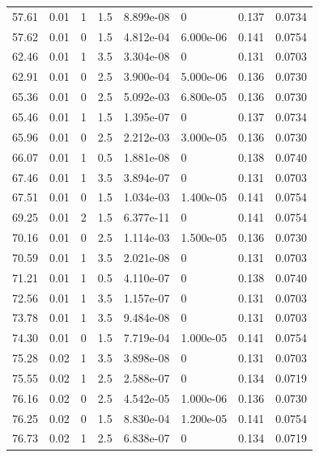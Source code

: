 \documentclass[preview]{standalone}
\begin{document}
{{{\begin{tabular}{L{1.2cm}C{1.2cm} C{0.3cm}C{0.5cm} C{1.4cm}C{1.4cm} C{1.4cm}C{1.4cm}}
  57.61  &  0.01  & 1     & 1.5 &  8.899e-08  & 0  & 0.137 &  0.0734   \\ 
  57.62  &  0.01  & 0     & 1.5 &  4.812e-04  & 6.000e-06  & 0.141 &  0.0754   \\ 
  62.46  &  0.01  & 1     & 3.5 &  3.304e-08  & 0  & 0.131 &  0.0703   \\ 
  62.91  &  0.01  & 0     & 2.5 &  3.900e-04  & 5.000e-06  & 0.136 &  0.0730   \\ 
  65.36  &  0.01  & 0     & 2.5 &  5.092e-03  & 6.800e-05  & 0.136 &  0.0730   \\ 
  65.46  &  0.01  & 1     & 1.5 &  1.395e-07  & 0  & 0.137 &  0.0734   \\ 
  65.96  &  0.01  & 0     & 2.5 &  2.212e-03  & 3.000e-05  & 0.136 &  0.0730   \\ 
  66.07  &  0.01  & 1     & 0.5 &  1.881e-08  & 0  & 0.138 &  0.0740   \\ 
  67.46  &  0.01  & 1     & 3.5 &  3.894e-07  & 0  & 0.131 &  0.0703   \\ 
  67.51  &  0.01  & 0     & 1.5 &  1.034e-03  & 1.400e-05  & 0.141 &  0.0754   \\ 
  69.25  &  0.01  & 2     & 1.5 &  6.377e-11  & 0  & 0.141 &  0.0754   \\ 
  70.16  &  0.01  & 0     & 2.5 &  1.114e-03  & 1.500e-05  & 0.136 &  0.0730   \\ 
  70.59  &  0.01  & 1     & 3.5 &  2.021e-08  & 0  & 0.131 &  0.0703   \\ 
  71.21  &  0.01  & 1     & 0.5 &  4.110e-07  & 0  & 0.138 &  0.0740   \\ 
  72.56  &  0.01  & 1     & 3.5 &  1.157e-07  & 0  & 0.131 &  0.0703   \\ 
  73.78  &  0.01  & 1     & 3.5 &  9.484e-08  & 0  & 0.131 &  0.0703   \\ 
  74.30  &  0.01  & 0     & 1.5 &  7.719e-04  & 1.000e-05  & 0.141 &  0.0754   \\ 
  75.28  &  0.02  & 1     & 3.5 &  3.898e-08  & 0  & 0.131 &  0.0703   \\ 
  75.55  &  0.02  & 1     & 2.5 &  2.588e-07  & 0  & 0.134 &  0.0719   \\ 
  76.16  &  0.02  & 0     & 2.5 &  4.542e-05  & 1.000e-06  & 0.136 &  0.0730   \\ 
  76.25  &  0.02  & 0     & 1.5 &  8.830e-04  & 1.200e-05  & 0.141 &  0.0754   \\ 
  76.73  &  0.02  & 1     & 2.5 &  6.838e-07  & 0  & 0.134 &  0.0719   \\ 

\end{tabular}}}}
\end{document}
